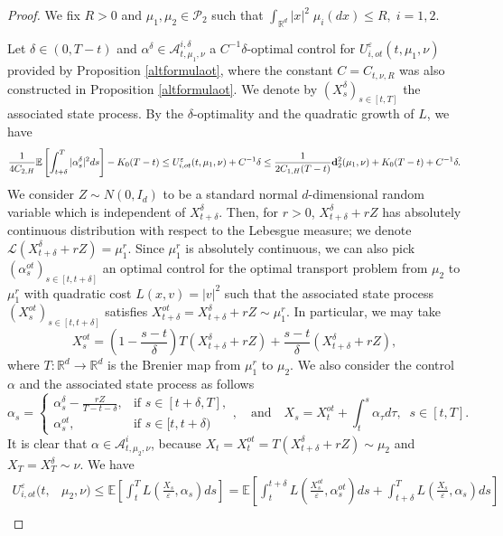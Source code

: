 \documentclass[reqno,11pt]{amsart}
\numberwithin{equation}{section}
\newcommand{\be}{\begin{equation}}
\newcommand{\ee}{\end{equation}}
\newcommand{\R}{\mathbb{R}} %
\newcommand{\e}{\varepsilon}
\newcommand{\nd}{\noindent}
\begin{document}
\begin{proof}
    We fix $R>0$ and $\mu_1,\mu_2\in \mathcal{P}_2$ such that $\int_{\R^d}|x|^2\;\mu_i(dx)\le R,\;i=1,2$.
    \vspace{1mm}

    \nd
    Let $\delta\in (0,T-t)$ and $\alpha^\delta\in \mathcal{A}_{t,\mu_1,\nu}^{i,\delta}$ a $C^{-1}\delta$-optimal control for $U^\e_{i,ot}(t,\mu_1,\nu)$ provided by Proposition  \ref{altformulaot}, where the constant $C=C_{t,\nu,R}$ was also constructed in Proposition \ref{altformulaot}. We denote by $(X_s^\delta)_{s\in [t,T]}$ the associated state process. By the $\delta$-optimality and the quadratic growth of $L$, we have
    \be\label{L2bound}
\frac{1}{4C_{2,H}}\mathbb{E}\left[\int_{t+\delta}^T|\alpha_s^\delta|^2ds\right]-K_0(T-t)\le U^\e_{i,ot}(t,\mu_1,\nu)+C^{-1}\delta\le \frac{1}{2C_{1,H}(T-t)}{\bf d}_2^2(\mu_1,\nu)+K_0(T-t)+C^{-1}\delta.
    \ee
    We consider $Z\sim N(0,I_d)$ to be a standard normal $d$-dimensional random variable which is independent of $X_{t+\delta}^\delta$. Then, for $r>0$, $X_{t+\delta}^\delta+rZ$ has absolutely continuous distribution with respect to the Lebesgue measure; we denote $\mathcal{L}(X_{t+\delta}^\delta+rZ)=\mu_1^r$. Since $\mu_1^r$ is absolutely continuous, we can also pick $(\alpha_s^{ot})_{s\in [t,t+\delta]}$ an optimal control for the optimal transport problem from $\mu_2$ to $\mu_1^r$ with quadratic cost $L(x,v)=|v|^2$ such that the associated state process $(X_s^{ot})_{s\in [t,t+\delta]}$ satisfies $X_{t+\delta}^{ot}=X_{t+\delta}^\delta+rZ\sim \mu_1^r$. In particular, we may take
    $$X_s^{ot}=\left(1-\frac{s-t}{\delta}\right)T(X_{t+\delta}^\delta+rZ)+\frac{s-t}{\delta}(X_{t+\delta}^\delta+rZ),$$
    where $T:\R^d\to \R^d$ is the Brenier map from $\mu_1^r$ to $\mu_2$. We also consider the control $\alpha$ and the associated state process as follows
    $$\alpha_s=\begin{cases}
        \alpha_s^\delta-\frac{rZ}{T-t-\delta},&\text{if }s\in [t+\delta,T],\\
        \alpha_s^{ot},&\text{if }s\in [t,t+\delta)
    \end{cases},\quad\text{and}\quad X_s=X_t^{ot}+\int_t^s\alpha_\tau d\tau,\;\;s\in[t,T].$$
    It is  clear that $\alpha \in\mathcal{A}_{t,\mu_2,\nu}^i$, because $X_t=X_t^{ot}=T(X_{t+\delta}^\delta+rZ)\sim \mu_2$ and $X_T=X_T^\delta\sim\nu$. We have
    \begin{align*}
        U_{i,ot}^\e(t,&\mu_2,\nu)\le \mathbb{E}\left[ \int_t^T L\left(\frac{X_s}{\e},\alpha_s\right)ds    \right]=\mathbb{E}\left[ \int_t^{t+\delta} L\left(\frac{X_s^{ot}}{\e},\alpha_s^{ot}\right)ds +\int_{t+\delta}^TL\left(\frac{X_s}{\e},\alpha_s\right)ds   \right]\\

\end{align*}
\end{proof}
\end{document}

